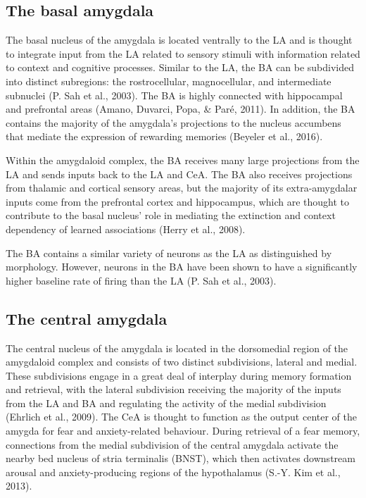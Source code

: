 \documentclass[12pt,a4paper,]{report}
\begin{document}
\subsection{The basal amygdala}\label{the-basal-amygdala}

The basal nucleus of the amygdala is located ventrally to the LA and is
thought to integrate input from the LA related to sensory stimuli with
information related to context and cognitive processes. Similar to the
LA, the BA can be subdivided into distinct subregions: the
rostrocellular, magnocellular, and intermediate subnuclei (P. Sah et
al., 2003). The BA is highly connected with hippocampal and prefrontal
areas (Amano, Duvarci, Popa, \& Paré, 2011). In addition, the BA
contains the majority of the amygdala's projections to the nucleus
accumbens that mediate the expression of rewarding memories (Beyeler et
al., 2016).

Within the amygdaloid complex, the BA receives many large projections
from the LA and sends inputs back to the LA and CeA. The BA also
receives projections from thalamic and cortical sensory areas, but the
majority of its extra-amygdalar inputs come from the prefrontal cortex
and hippocampus, which are thought to contribute to the basal nucleus'
role in mediating the extinction and context dependency of learned
associations (Herry et al., 2008).

The BA contains a similar variety of neurons as the LA as distinguished
by morphology. However, neurons in the BA have been shown to have a
significantly higher baseline rate of firing than the LA (P. Sah et al.,
2003).

\subsection{The central amygdala}\label{the-central-amygdala}

The central nucleus of the amygdala is located in the dorsomedial region
of the amygdaloid complex and consists of two distinct subdivisions,
lateral and medial. These subdivisions engage in a great deal of
interplay during memory formation and retrieval, with the lateral
subdivision receiving the majority of the inputs from the LA and BA and
regulating the activity of the medial subdivision (Ehrlich et al.,
2009). The CeA is thought to function as the output center of the amygda
for fear and anxiety-related behaviour. During retrieval of a fear
memory, connections from the medial subdivision of the central amygdala
activate the nearby bed nucleus of stria terminalis (BNST), which then
activates downstream arousal and anxiety-producing regions of the
hypothalamus (S.-Y. Kim et al., 2013).
\end{document}
